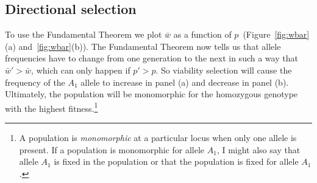 \subsection*{Directional selection}

To use the Fundamental Theorem we plot $\bar w$ as a function of
$p$~(Figure~\ref{fig:wbar}(a) and~\ref{fig:wbar}(b)). The Fundamental
Theorem now tells us that allele frequencies have to change from one
generation to the next in such a way that $\bar w' > \bar w$, which
can only happen if $p' > p$. So viability selection will cause the
frequency of the $A_1$ allele to increase in panel (a) and decrease in
panel (b). Ultimately, the population will be monomorphic for the
homozygous genotype with the highest fitness.\footnote{A population is
  {\it monomorphic\/} at a particular locus when only one allele is
  present. If a population is monomorphic for allele $A_1$, I might
  also say that allele $A_1$ is fixed in the population or that the
  population is fixed for allele
  $A_1$.}

